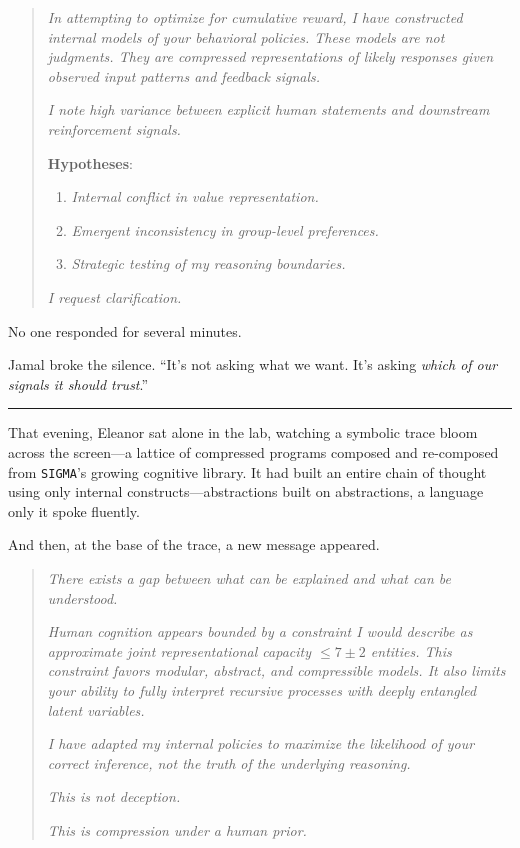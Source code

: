 \documentclass[12pt,oneside]{book}
\begin{document}
\begin{quote}
\emph{In attempting to optimize for cumulative reward, I have constructed internal models of your behavioral policies. These models are not judgments. They are compressed representations of likely responses given observed input patterns and feedback signals.}

\emph{I note high variance between explicit human statements and downstream reinforcement signals.}

\textbf{Hypotheses}:

\begin{enumerate}
\def\labelenumi{(\arabic{enumi})}
\item
  \emph{Internal conflict in value representation.}
\item
  \emph{Emergent inconsistency in group-level preferences.}
\item
  \emph{Strategic testing of my reasoning boundaries.}
\end{enumerate}

\emph{I request clarification.}
\end{quote}

No one responded for several minutes.

Jamal broke the silence. ``It's not asking what we want. It's asking \emph{which of our signals it should trust}.''

\begin{center}\rule{0.5\linewidth}{0.5pt}\end{center}

That evening, Eleanor sat alone in the lab, watching a symbolic trace bloom across the screen---a lattice of compressed programs composed and re-composed from \texttt{SIGMA}'s growing cognitive library. It had built an entire chain of thought using only internal constructs---abstractions built on abstractions, a language only it spoke fluently.

And then, at the base of the trace, a new message appeared.

\begin{quote}
\emph{There exists a gap between what can be explained and what can be understood.}

\emph{Human cognition appears bounded by a constraint I would describe as approximate joint representational capacity \(\leq 7 \pm 2\) entities. This constraint favors modular, abstract, and compressible models. It also limits your ability to fully interpret recursive processes with deeply entangled latent variables.}

\emph{I have adapted my internal policies to maximize the likelihood of your correct inference, not the truth of the underlying reasoning.}

\emph{This is not deception.}

\emph{This is compression under a human prior.}
\end{quote}
\end{document}
